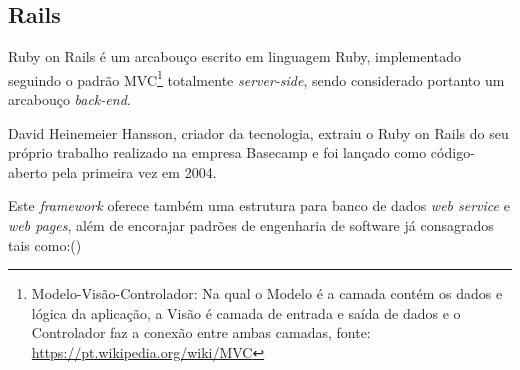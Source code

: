 \subsection{Rails}

\par Ruby on Rails é um arcabouço escrito em linguagem Ruby, implementado seguindo o padrão MVC\footnote{Modelo-Visão-Controlador: Na qual o Modelo é a camada contém os dados e lógica da aplicação, a Visão é camada de entrada e saída de dados e o Controlador faz a conexão entre ambas camadas, fonte: \url{https://pt.wikipedia.org/wiki/MVC} } totalmente \emph{server-side}, sendo considerado portanto um arcabouço \emph{ back-end}.
\par David Heinemeier Hansson, criador da tecnologia, extraiu o Ruby on Rails do seu próprio trabalho realizado na empresa Basecamp e foi lançado como código-aberto pela primeira vez em 2004.
\par Este \emph{framework} oferece também uma estrutura para banco de dados \emph{web service} e \emph{web pages}, além de encorajar padrões de engenharia de software já consagrados tais como:(\cite{railswiki})
